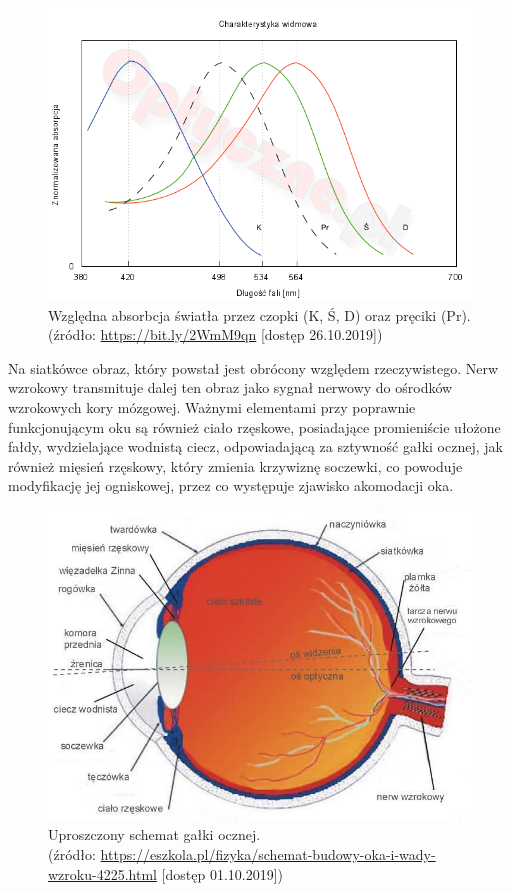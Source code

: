 \begin{figure}[H]
    \centering
    \captionsetup{justification=centering,margin=2cm}
    \includegraphics[width=0.9\linewidth]{resources/czopki.png}
    \caption[Względna absorbcja światła przez czopki oraz pręciki.]{Względna absorbcja światła przez czopki (K, Ś, D) oraz pręciki (Pr).\\\hspace{\textwidth}
    \small(źródło: \url{https://bit.ly/2WmM9qn} [dostęp 26.10.2019])}
    \label{fig:czopki}
\end{figure}
Na siatkówce obraz, który powstał jest obrócony względem rzeczywistego. Nerw wzrokowy transmituje dalej ten obraz jako sygnał nerwowy do ośrodków wzrokowych kory mózgowej. Ważnymi elementami przy poprawnie funkcjonującym oku są również ciało rzęskowe, posiadające promieniście ułożone fałdy, wydzielające wodnistą ciecz, odpowiadającą za sztywność gałki ocznej, jak również mięsień rzęskowy, który zmienia krzywiznę soczewki, co powoduje modyfikację jej ogniskowej, przez co występuje zjawisko akomodacji oka.
\begin{figure}[H]
    \centering
    \captionsetup{justification=centering,margin=2cm}
    \includegraphics[width=0.8\linewidth]{resources/oko_galka.jpg}
    \caption[Przekrój oka.]{Uproszczony schemat gałki ocznej.\\\hspace{\textwidth} 
    \small(źródło: \url{https://eszkola.pl/fizyka/schemat-budowy-oka-i-wady-wzroku-4225.html} [dostęp 01.10.2019])}
    \label{fig:budowaoka}
\end{figure}
